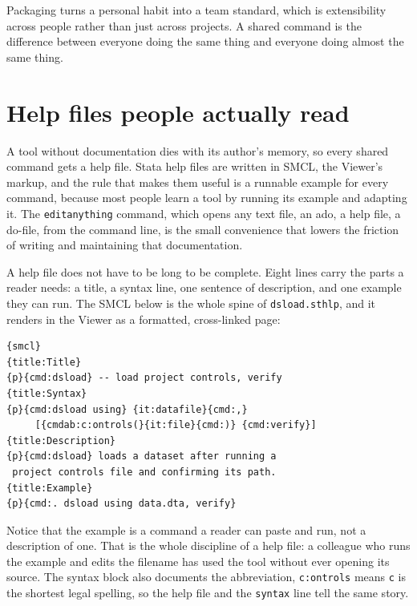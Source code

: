 \documentclass[
    a4paper,
    fontsize=10pt,
    twoside=true,
    numbers=noenddot,
]{kaobook}
\begin{document}
Packaging turns a personal habit into a team standard, which is extensibility across people rather than just across projects. A shared command is the difference between everyone doing the same thing and everyone doing almost the same thing.

\section{Help files people actually read}
A tool without documentation dies with its author's memory, so every shared command gets a help file. Stata help files are written in SMCL, the Viewer's markup, and the rule that makes them useful is a runnable example for every command, because most people learn a tool by running its example and adapting it. The \texttt{editanything} command, which opens any text file, an ado, a help file, a do-file, from the command line, is the small convenience that lowers the friction of writing and maintaining that documentation.

A help file does not have to be long to be complete. Eight lines carry the parts a reader needs: a title, a syntax line, one sentence of description, and one example they can run. The SMCL below is the whole spine of \texttt{dsload.sthlp}, and it renders in the Viewer as a formatted, cross-linked page:
{\footnotesize
\begin{verbatim}
{smcl}
{title:Title}
{p}{cmd:dsload} -- load project controls, verify
{title:Syntax}
{p}{cmd:dsload using} {it:datafile}{cmd:,}
     [{cmdab:c:ontrols(}{it:file}{cmd:)} {cmd:verify}]
{title:Description}
{p}{cmd:dsload} loads a dataset after running a
 project controls file and confirming its path.
{title:Example}
{p}{cmd:. dsload using data.dta, verify}
\end{verbatim}
}
Notice that the example is a command a reader can paste and run, not a description of one. That is the whole discipline of a help file: a colleague who runs the example and edits the filename has used the tool without ever opening its source. The syntax block also documents the abbreviation, \texttt{c:ontrols} means \texttt{c} is the shortest legal spelling, so the help file and the \texttt{syntax} line tell the same story.
\end{document}
